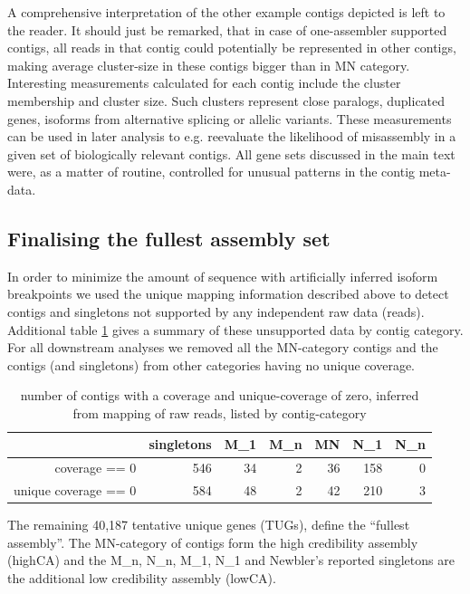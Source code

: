 \documentclass[12pt,a4paper]{article}
\begin{document}
A comprehensive interpretation of the other example contigs depicted
is left to the reader. It should just be remarked, that in case of
one-assembler supported contigs, all reads in that contig could
potentially be represented in other contigs, making average
cluster-size in these contigs bigger than in MN category.\\

Interesting measurements calculated for each contig include the
cluster membership and cluster size. Such clusters represent close
paralogs, duplicated genes, isoforms from alternative splicing or
allelic variants. These measurements can be used in later analysis to
e.g. reevaluate the likelihood of misassembly in a given set of
biologically relevant contigs. All gene sets discussed in the main
text were, as a matter of routine, controlled for unusual patterns in
the contig meta-data.
\newpage

\subsection{Finalising the fullest assembly set}
\label{sec:final-full-assembly}

In order to minimize the amount of sequence with artificially inferred
isoform breakpoints we used the unique mapping information described
above to detect contigs and singletons not supported by any
independent raw data (reads). Additional table \ref{tab:cov.ex} gives
a summary of these unsupported data by contig category. For all
downstream analyses we removed all the MN-category contigs and the
contigs (and singletons) from other categories having no unique
coverage.


\begin{table}[ht]
\begin{center}
\begin{tabular}{rrrrrrr}
  \hline
 & singletons & M\_1 & M\_n & MN & N\_1 & N\_n \\ 
  \hline
coverage == 0 & 546 &  34 &   2 &  36 & 158 &   0 \\ 
  unique coverage == 0 & 584 &  48 &   2 &  42 & 210 &   3 \\ 
   \hline
\end{tabular}
\caption{number of contigs with a coverage and unique-coverage of zero, inferred from mapping of raw reads, listed by contig-category}
\label{tab:cov.ex}
\end{center}
\end{table}
The remaining 40,187 tentative unique genes (TUGs), define the
``fullest assembly''. The MN-category of contigs form the high
credibility assembly (highCA) and the M\_n, N\_n, M\_1, N\_1 and
Newbler's reported singletons are the additional low credibility
assembly (lowCA).
\end{document}
